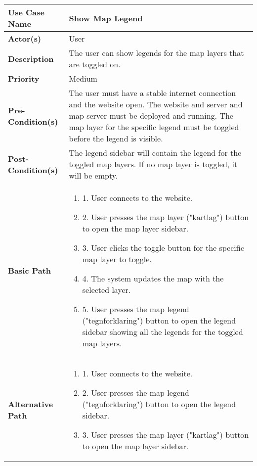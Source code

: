 \begin{table}[h]
    \centering
    \renewcommand{\arraystretch}{1.5}
    \begin{tabularx}{\textwidth}{|l|X|}
        \hline
        \rowcolor{gray!20}
        \textbf{Use Case Name} & Show Map Legend \\
        \hline
        \textbf{Actor(s)} & User \\
        \hline
        \textbf{Description} & The user can show legends for the map layers that are toggled on. \\
        \hline
        \textbf{Priority} & Medium \\
        \hline
        \textbf{Pre-Condition(s)} & The user must have a stable internet connection and the website open. The website and server and map server must be deployed and running. The map layer for the specific legend must be toggled before the legend is visible. \\
        \hline
        \textbf{Post-Condition(s)} & The legend sidebar will contain the legend for the toggled map layers. If no map layer is toggled, it will be empty. \\
        \hline
        \textbf{Basic Path} &  
        \begin{enumerate}[label=,left=0pt]
            \item 1. User connects to the website.
            \item 2. User presses the map layer ("kartlag") button to open the map layer sidebar.
            \item 3. User clicks the toggle button for the specific map layer to toggle.
            \item 4. The system updates the map with the selected layer.
            \item 5. User presses the map legend ("tegnforklaring") button to open the legend sidebar showing all the legends for the toggled map layers.
        \end{enumerate} \\
        \hline
        \textbf{Alternative Path} & 
        \begin{enumerate}[label=,left=0pt]
            \item 1. User connects to the website.
            \item 2. User presses the map legend ("tegnforklaring") button to open the legend sidebar.
            \item 3. User presses the map layer ("kartlag") button to open the map layer sidebar.

\end{enumerate}
\end{tabularx}
\end{table}
